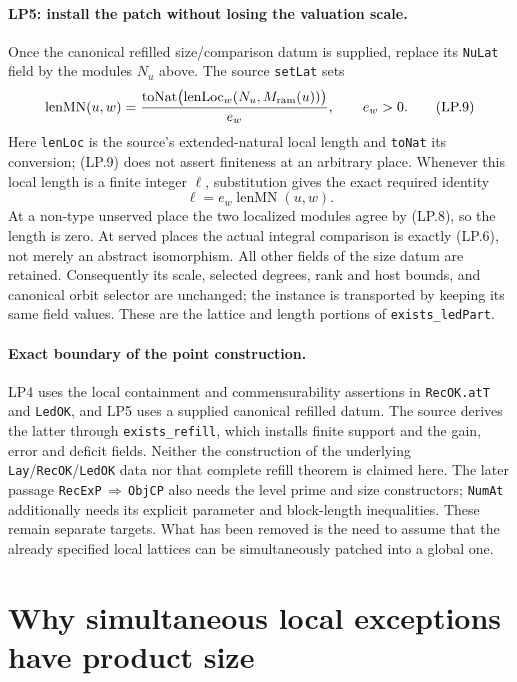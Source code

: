 \documentclass[11pt,a4paper]{article}
\numberwithin{equation}{section}
\theoremstyle{remark}\newtheorem{remark}[theorem]{Remark}
\begin{document}
\paragraph{LP5: install the patch without losing the valuation scale.}
Once the canonical refilled size/comparison datum is supplied, replace
its \texttt{NuLat} field by the modules $N_u$ above. The source
\texttt{setLat} sets
\[
 \operatorname{lenMN}(u,w)
  =\frac{\operatorname{toNat}\bigl(\operatorname{lenLoc}_w
                                      (N_u,M_{\rm ram}(u))\bigr)}{e_w},
              \qquad e_w>0.                                  \tag{LP.9}
\]
Here \texttt{lenLoc} is the source's extended-natural local length
and \texttt{toNat} its conversion; (LP.9) does not assert finiteness
at an arbitrary place. Whenever this local length is a finite integer
$\ell$, substitution gives the exact required identity
\[
                   \ell=e_w\operatorname{lenMN}(u,w).           \tag{LP.10}
\]
At a non-type unserved place the two localized modules agree by
(LP.8), so the length is zero. At served places the actual integral
comparison is exactly (LP.6), not merely an abstract isomorphism.
All other fields of the size datum are retained. Consequently its
scale, selected degrees, rank and host bounds, and canonical orbit
selector are unchanged; the instance is transported by keeping its
same field values. These are the lattice and length portions of
\texttt{exists\_ledPart}.

\paragraph{Exact boundary of the point construction.}
LP4 uses the local containment and commensurability assertions in
\texttt{RecOK.atT} and \texttt{LedOK}, and LP5 uses a supplied
canonical refilled datum. The source derives the latter through
\texttt{exists\_refill}, which installs finite support and the gain,
error and deficit fields. Neither the construction of the underlying
\texttt{Lay}/\texttt{RecOK}/\texttt{LedOK} data nor that complete
refill theorem is claimed here. The later passage
\texttt{RecExP}\,$\Rightarrow$\,\texttt{ObjCP} also needs the level
prime and size constructors; \texttt{NumAt} additionally needs its
explicit parameter and block-length inequalities. These remain
separate targets. What has been removed is the need to assume that
the already specified local lattices can be simultaneously patched
into a global one.


\section{Why simultaneous local exceptions have product size}\label{sec:joint-rank}
\end{document}

